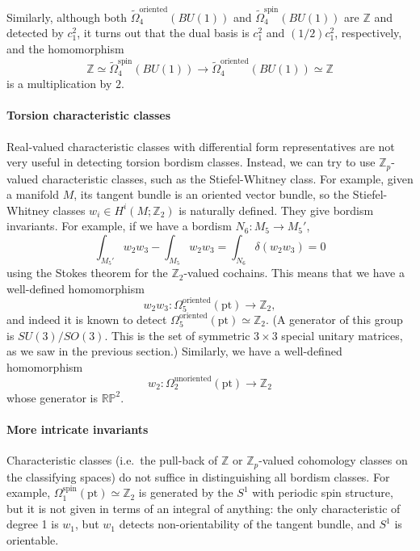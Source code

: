 \documentclass[12pt]{article}
\numberwithin{equation}{section}
\numberwithin{figure}{section}
\theoremstyle{remark}
\def\bZ{\mathbb{Z}}
\def\RP{\mathbb{RP}}
\def\pt{\mathrm{pt}}
\begin{document}
Similarly, although both $\tilde\Omega^\text{oriented}_4(BU(1))$ and $\tilde\Omega^\text{spin}_4(BU(1))$
are $\bZ$ and detected by $c_1^2$, 
it turns out that the dual basis is $c_1^2$ and $(1/2)c_1^2$, respectively, and the homomorphism \begin{equation}
\bZ\simeq \tilde\Omega^\text{spin}_4(BU(1)) \to \tilde\Omega^\text{oriented}_4(BU(1)) \simeq \bZ
\end{equation} is a multiplication by $2$.

\paragraph{Torsion characteristic classes}
Real-valued characteristic classes with differential form representatives are not very useful
in detecting torsion bordism classes.
Instead, we can try to use $\bZ_p$-valued characteristic classes, such as the Stiefel-Whitney class.
For example, given a manifold $M$, its tangent bundle is an oriented vector bundle,
so the Stiefel-Whitney classes $w_i\in H^i(M;\bZ_2)$ is naturally defined.
They give bordism invariants. For example, if we have a bordism $N_6:M_5\to M_5'$,
\begin{equation}
\int_{M_5' } w_2w_3 -
\int_{M_5 } w_2w_3 
= \int_{N_6} \delta(w_2w_3) = 0
\end{equation} using the Stokes theorem for the $\bZ_2$-valued cochains.
This means that we have a well-defined homomorphism \begin{equation}
w_2w_3: \Omega^\text{oriented}_5(\pt) \to \bZ_2,
\end{equation} and indeed it is known to detect $\Omega^\text{oriented}_5(\pt)\simeq \bZ_2$.
(A generator of this group is $SU(3)/SO(3)$.
This is the set of symmetric $3\times 3$ special unitary matrices, as we saw in the previous section.)
Similarly, we have a well-defined homomorphism \begin{equation}
w_2:\Omega^\text{unoriented}_2(\pt)\to \bZ_2
\end{equation}
whose generator is $\RP^2$.

\paragraph{More intricate invariants}
Characteristic classes (i.e.~the pull-back of $\bZ$ or $\bZ_p$-valued cohomology classes on
the classifying spaces) do not suffice in distinguishing all bordism classes.
For example, $\Omega^\text{spin}_1(\pt)\simeq\bZ_2$
is generated by the $S^1$ with periodic spin structure,
but it is not given in terms of an integral of anything:
the only characteristic of degree 1 is $w_1$, but $w_1$ detects non-orientability of the tangent bundle,
and $S^1$ is orientable.
\end{document}

